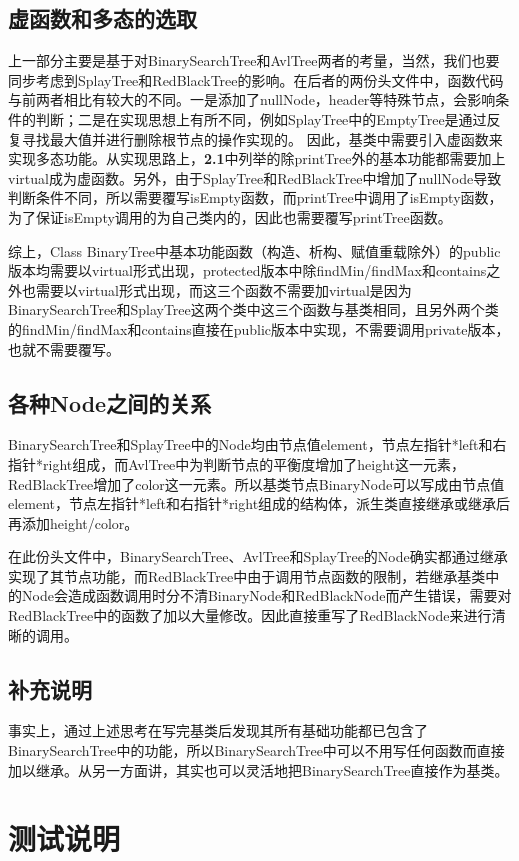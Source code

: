 \documentclass[UTF8]{ctexart}
\begin{document}
\subsection{虚函数和多态的选取}
上一部分主要是基于对BinarySearchTree和AvlTree两者的考量，当然，我们也要同步考虑到SplayTree和RedBlackTree的影响。在后者的两份头文件中，函数代码与前两者相比有较大的不同。一是添加了nullNode，header等特殊节点，会影响条件的判断；二是在实现思想上有所不同，例如SplayTree中的EmptyTree是通过反复寻找最大值并进行删除根节点的操作实现的。
因此，基类中需要引入虚函数来实现多态功能。从实现思路上，\textbf{2.1}中列举的除printTree外的基本功能都需要加上virtual成为虚函数。另外，由于SplayTree和RedBlackTree中增加了nullNode导致判断条件不同，所以需要覆写isEmpty函数，而printTree中调用了isEmpty函数，为了保证isEmpty调用的为自己类内的，因此也需要覆写printTree函数。\par
综上，Class BinaryTree中基本功能函数（构造、析构、赋值重载除外）的public版本均需要以virtual形式出现，protected版本中除findMin/findMax和contains之外也需要以virtual形式出现，而这三个函数不需要加virtual是因为BinarySearchTree和SplayTree这两个类中这三个函数与基类相同，且另外两个类的findMin/findMax和contains直接在public版本中实现，不需要调用private版本，也就不需要覆写。
\subsection{各种Node之间的关系}
BinarySearchTree和SplayTree中的Node均由节点值element，节点左指针*left和右指针*right组成，而AvlTree中为判断节点的平衡度增加了height这一元素，RedBlackTree增加了color这一元素。所以基类节点BinaryNode可以写成由节点值element，节点左指针*left和右指针*right组成的结构体，派生类直接继承或继承后再添加height/color。\par
在此份头文件中，BinarySearchTree、AvlTree和SplayTree的Node确实都通过继承实现了其节点功能，而RedBlackTree中由于调用节点函数的限制，若继承基类中的Node会造成函数调用时分不清BinaryNode和RedBlackNode而产生错误，需要对RedBlackTree中的函数了加以大量修改。因此直接重写了RedBlackNode来进行清晰的调用。\par
\subsection{补充说明}
事实上，通过上述思考在写完基类后发现其所有基础功能都已包含了BinarySearchTree中的功能，所以BinarySearchTree中可以不用写任何函数而直接加以继承。从另一方面讲，其实也可以灵活地把BinarySearchTree直接作为基类。
\section{测试说明}
\end{document}
